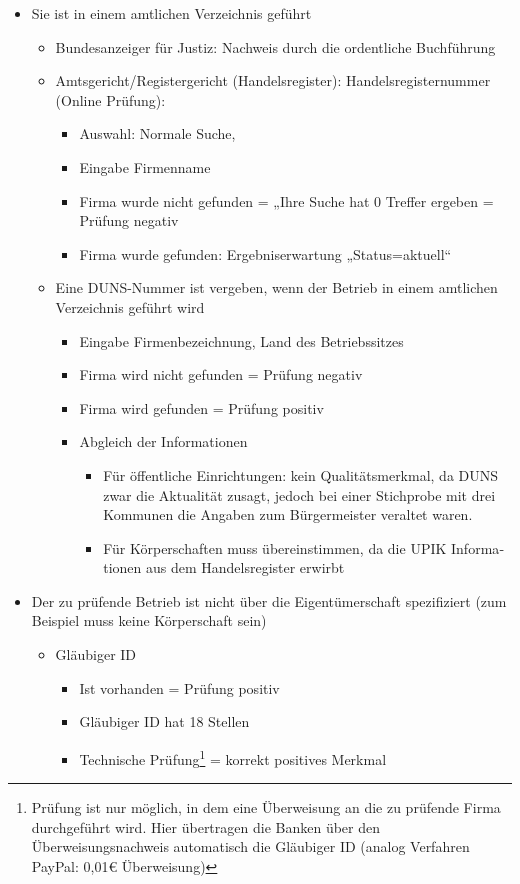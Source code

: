 \begin{otherlanguage}{german}
\begin{itemize}
\item Sie ist in einem amtlichen Verzeichnis geführt
	\begin{itemize}
	\item Bundesanzeiger für Justiz: Nachweis durch die ordentliche Buchführung
	\item Amtsgericht/Registergericht (Handelsregister): Handelsregisternummer (Online Prüfung):
		\begin{itemize}
		\item Auswahl: Normale Suche,
		\item Eingabe Firmenname
		\item Firma wurde nicht gefunden = „Ihre Suche hat 0 Treffer ergeben = Prüfung negativ
		\item Firma wurde gefunden: Ergebniserwartung „Status=aktuell“
		\end{itemize}
\item Eine DUNS-Nummer ist vergeben, wenn der Betrieb in einem amtlichen Verzeichnis geführt wird
	\begin{itemize}
	\item Eingabe Firmenbezeichnung, Land des Betriebssitzes
	\item Firma wird nicht gefunden = Prüfung negativ
	\item Firma wird gefunden = Prüfung positiv
	\item Abgleich der Informationen 
		\begin{itemize}
		\item Für öffentliche Einrichtungen: kein Qualitätsmerkmal, da DUNS zwar die Aktualität zusagt, jedoch bei einer Stichprobe mit drei Kommunen die Angaben zum Bürgermeister veraltet waren.
		\item Für Körperschaften muss übereinstimmen, da die UPIK Informationen aus dem Handelsregister erwirbt
		\end{itemize}		
		\end{itemize}

	\end{itemize}
\item Der zu prüfende Betrieb ist nicht über die Eigentümerschaft spezifiziert (zum Beispiel muss keine Körperschaft sein)
	\begin{itemize}
	\item Gläubiger ID 
		\begin{itemize}
		\item Ist vorhanden = Prüfung positiv
		\item Gläubiger ID hat 18 Stellen
		\item Technische Prüfung\footnote{Prüfung ist nur möglich, in dem eine Überweisung an die zu prüfende Firma durchgeführt wird. Hier übertragen die Banken über den Überweisungsnachweis automatisch die Gläubiger ID (analog Verfahren PayPal: 0,01€ Überweisung)} = korrekt  positives Merkmal\\
		

\end{itemize}
\end{itemize}
\end{itemize}
\end{otherlanguage}
